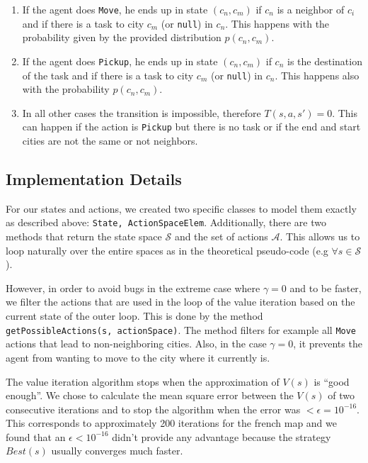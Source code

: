 \documentclass[11pt]{article}
\begin{document}
 \begin{enumerate}
   
\item 
If the agent does \texttt{Move},  
he ends up in state $(c_n, c_m)$ if $c_n$ is a neighbor of $c_i$ and if there is 
a task to city $c_m$ (or \texttt{null}) in $c_n$.
This happens with the probability  given by the provided distribution $p(c_n, c_m)$.

\item If the agent does \texttt{Pickup},  
he ends up in state $(c_n, c_m)$ if $c_n$ is the destination of the task and if there is 
a task to city $c_m$ (or \texttt{null}) in $c_n$.
This happens also with the probability $p(c_n, c_m)$.

\item 
In all other cases the transition is impossible, therefore $T(s, a, s') = 0$. 
This can happen if the action is \texttt{Pickup} but there is no task or if the 
end and start cities are not the same or not neighbors.

\end{enumerate}



\subsection{Implementation Details}
For our states and actions, we created two specific classes to model 
them exactly as described above: \texttt{State, ActionSpaceElem}.
Additionally, there are two methods that return the state space $\mathcal{S}$ and the set of 
actions $\mathcal{A}$. This allows us to loop naturally over the entire 
spaces as in the theoretical pseudo-code (e.g $\forall s \in \mathcal{S}$). 

However, in order to avoid bugs in the extreme case where $\gamma = 0$ 
and to be faster, we filter the actions that are used in the loop of the value 
iteration based on the current state of the outer loop. This is done by the 
method \texttt{getPossibleActions(s, actionSpace)}. The method filters for 
example all \texttt{Move} actions that lead to non-neighboring cities. Also, in 
the case $\gamma = 0$, it prevents the agent from wanting to move to the city 
where it currently is.

The value iteration algorithm stops when the approximation of $V(s)$ is ``good 
enough''.
We chose to calculate the mean square error between the $V(s)$ of two 
consecutive iterations and to stop the algorithm when the error was $ < 
\epsilon = 10^{-16}$. This corresponds to approximately 200 iterations for
the french map and we found that an $\epsilon < 10^{-16}$ didn't provide any 
advantage because the strategy $Best(s)$ usually converges much faster.
\end{document}
